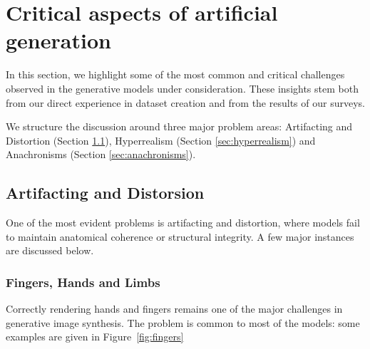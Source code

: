 \documentclass[sn-mathphys]{sn-jnl}
\begin{document}
\section{Critical aspects of artificial generation}
\label{sec:discussion}
In this section, we highlight some of the most common and critical challenges observed in the generative models under consideration. These insights stem both from our direct experience in dataset creation and from the results of our surveys.

We structure the discussion around three major problem areas: Artifacting and Distortion (Section \ref{sec:artifacts}), Hyperrealism (Section \ref{sec:hyperrealism})
and Anachronisms (Section \ref{sec:anachronisms}).

\subsection{Artifacting and Distorsion}
\label{sec:artifacts}
One of the most evident problems is artifacting and distortion, where models fail to maintain anatomical coherence or structural integrity.
A few major instances are discussed below.

\subsubsection{Fingers, Hands and Limbs}
Correctly rendering hands and fingers remains one of the major challenges in generative image synthesis. 
The problem is common to most of the models: some examples are given in  Figure~\ref{fig:fingers}
\end{document}
